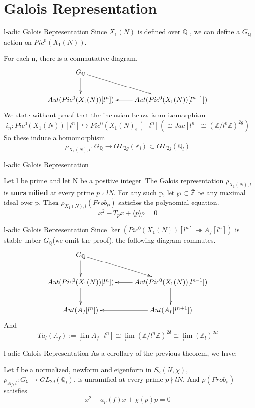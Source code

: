 \documentclass{beamer}
\theoremstyle{plain}
\theoremstyle{definition}
\theoremstyle{remark}
\newcommand{\Q}{\mathbb{Q}}
\newcommand{\Z}{\mathbb{Z}}
\begin{document}
\section{Galois Representation}
\begin{frame}{l-adic Galois Representation}
    Since $X_1(N)$ is defined over $\Q$ , we can define a $G_{\Q}$ action on $Pic^0(X_1(N))$.

    For each n, there is a commutative diagram.
    \[\xymatrix{
            G_{\Q} \ar[d] \ar[rd] &\\
            Aut(Pic^0(X_1(N))[l^n])  &  Aut(Pic^0(X_1(N))[l^{n+1}]) \ar[l]
        }
    \]\pause
    We state without proof that the inclusion below is an isomorphism.
    \[i_n: Pic^0(X_1(N))[l^n] \hookrightarrow Pic^0(X_1(N)_{\mathbb{C}})[l^n]( \cong Jac[l^n] \cong (\Z/l^n\Z)^{2g})\]
    \pause
    So these induce a homomorphism
    \[ \rho_{X_1(N),l}: G_{\Q}\to GL_{2g}(\Z_l) \subset GL_{2g}(\Q_l)\]
\end{frame}

\begin{frame}{l-adic Galois Representation}
    \begin{theorem}
        Let l be prime and let N be a positive integer. The Galois representation
        $\rho_{X_1(N),l}$ is \textbf{unramified} at every prime $p \nmid lN$. For any such p,
        let $\wp \subset \bar{\Z}$ be any maximal ideal over p. Then $\rho_{X_1(N),l}(Frob_{\wp})$
        satisfies the polynomial equation.
        \[x^2-T_px+\langle p \rangle p=0\]
    \end{theorem}
\end{frame}

\begin{frame}{l-adic Galois Representation}
    Since $\ker(Pic^0(X_1(N))[l^n]\twoheadrightarrow  A_f[l^n])$ is stable unber $G_{\Q}$(we omit the proof), the following diagram commutes.
    \[\xymatrix{
        G_{\Q} \ar[d] \ar[rd] &\\
        Aut(Pic^0(X_1(N))[l^n]) \ar[d] &  Aut(Pic^0(X_1(N))[l^{n+1}]) \ar[l] \ar[d] \\
        Aut(A_f[l^n]) & Aut(A_f[l^{n+1}]) \ar[l]
        }
    \]
    And \[Ta_l(A_f) := \lim_{\leftarrow}A_f[l^n] \cong \lim_{\leftarrow} (\Z/l^n\Z)^{2d} \cong \lim_{\leftarrow}(\Z_l)^{2d}\]
\end{frame}

\begin{frame}{l-adic Galois Representation}
    As a corollary of the previous theorem, we have:
    \begin{theorem}
        Let f be a normalized, newform and eigenform in $S_2(N,\chi)$, \ $\rho_{A_f,l}: G_{\Q} \to GL_{2d}(\Q_l)$, is unramified at every prime $p \nmid lN$. And $\rho(Frob_{\wp})$ satisfies
        \[x^2-a_p(f)x+\chi(p)p=0\]
    \end{theorem}
\end{frame}
\end{document}
